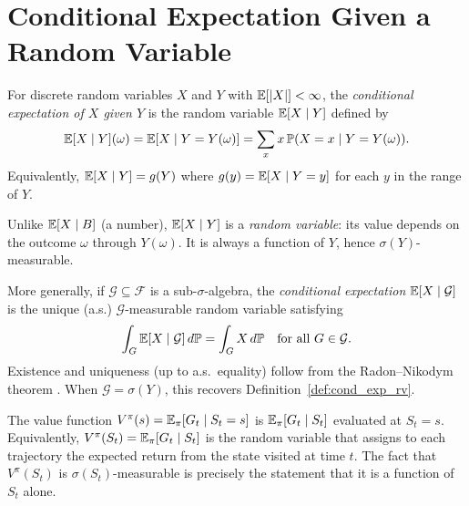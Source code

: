 \documentclass[11pt,a4paper]{article}
\begin{document}

\section{Conditional Expectation Given a Random Variable}
\label{sec:cond_rv}

\begin{definition}
\label{def:cond_exp_rv}
For discrete random variables $X$ and $Y$ with
$\mathbb{E}[|X|] < \infty$, the \emph{conditional expectation of $X$
given $Y$} is the random variable $\mathbb{E}[X \mid Y]$ defined by
\begin{equation}
  \mathbb{E}[X \mid Y](\omega) = \mathbb{E}[X \mid Y = Y(\omega)]
  = \sum_x x\, \mathbb{P}(X = x \mid Y = Y(\omega)).
  \label{eq:cond_exp_rv}
\end{equation}
Equivalently, $\mathbb{E}[X \mid Y] = g(Y)$ where
$g(y) = \mathbb{E}[X \mid Y = y]$ for each $y$ in the range of $Y$.
\end{definition}

\begin{remark}
Unlike $\mathbb{E}[X \mid B]$ (a number), $\mathbb{E}[X \mid Y]$ is a
\emph{random variable}: its value depends on the outcome
$\omega$ through $Y(\omega)$.  It is always a function of $Y$,
hence $\sigma(Y)$-measurable.
\end{remark}

\begin{definition}
\label{def:cond_exp_sigma}
More generally, if $\mathcal{G} \subseteq \mathcal{F}$ is a
sub-$\sigma$-algebra, the \emph{conditional expectation
$\mathbb{E}[X \mid \mathcal{G}]$} is the unique (a.s.)
$\mathcal{G}$-measurable random variable satisfying
\begin{equation}
  \int_G \mathbb{E}[X \mid \mathcal{G}]\, d\mathbb{P}
  = \int_G X\, d\mathbb{P}
  \quad \text{for all } G \in \mathcal{G}.
  \label{eq:cond_exp_sigma}
\end{equation}
Existence and uniqueness (up to a.s.\ equality) follow from the
Radon--Nikodym theorem \citep{durrett2019, billingsley1995}.
When $\mathcal{G} = \sigma(Y)$, this recovers
Definition~\ref{def:cond_exp_rv}.
\end{definition}

\begin{rlconnection}[title={Connection to RL}]
The value function $V^\pi(s) = \mathbb{E}_\pi[G_t \mid S_t = s]$ is
$\mathbb{E}_\pi[G_t \mid S_t]$ evaluated at $S_t = s$.
Equivalently, $V^\pi(S_t) = \mathbb{E}_\pi[G_t \mid S_t]$ is the random
variable that assigns to each trajectory the expected return from
the state visited at time $t$.  The fact that $V^\pi(S_t)$ is
$\sigma(S_t)$-measurable is precisely the statement that it is a
function of $S_t$ alone.
\end{rlconnection}
\end{document}
